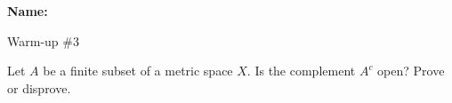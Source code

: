 \documentclass[12pt]{article}
\begin{document}
\noindent \textbf{Name:} 

\begin{center}
Warm-up \#3
\end{center}

\noindent Let $A$ be a finite subset of a metric space $X$. Is the complement $A^c$ open? Prove or disprove. 
\end{document}
